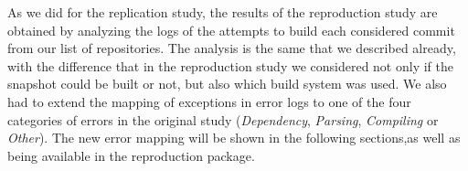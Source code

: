 As we did for the replication study, the results of the reproduction study are obtained by analyzing the logs of the attempts to build each considered commit from our list of repositories. The analysis is the same that we described already, with the difference that in the reproduction study we considered not only if the snapshot could be built or not, but also which build system was used. We also had to extend the mapping of exceptions in error logs to one of the four categories of errors in the original study (\textit{Dependency}, \textit{Parsing}, \textit{Compiling} or \textit{Other}). 
The new error mapping will be shown in the following sections,as well as being available in the reproduction package.
